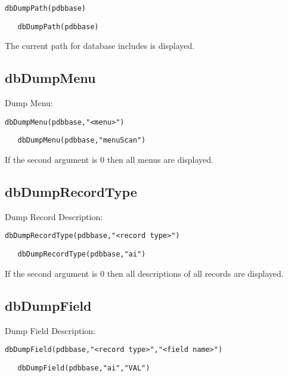 \begin{verbatim}
dbDumpPath(pdbbase)
\end{verbatim}

\begin{verbatim}
   dbDumpPath(pdbbase)
\end{verbatim}

The current path for database includes is displayed.

\subsection{dbDumpMenu}

Dump Menu:

\begin{verbatim}
dbDumpMenu(pdbbase,"<menu>")
\end{verbatim}

\begin{verbatim}
   dbDumpMenu(pdbbase,"menuScan")
\end{verbatim}

If the second argument is 0 then all menus are displayed.



\subsection{dbDumpRecordType}

Dump Record Description:

\begin{verbatim}
dbDumpRecordType(pdbbase,"<record type>")
\end{verbatim}

\begin{verbatim}
   dbDumpRecordType(pdbbase,"ai")
\end{verbatim}

If the second argument is 0 then all descriptions of all records are displayed.

\subsection{dbDumpField}

Dump Field Description:

\begin{verbatim}
dbDumpField(pdbbase,"<record type>","<field name>")
\end{verbatim}

\begin{verbatim}
   dbDumpField(pdbbase,"ai","VAL")
\end{verbatim}

